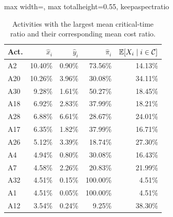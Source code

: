 \begin{table}[H]
\centering
\caption{Activities with the largest mean critical-time ratio and their corresponding mean cost ratio.}
\label{tab:top-activity-cost-critical-time-metric}
\scriptsize
\setlength{\tabcolsep}{4pt}
\renewcommand{\arraystretch}{0.95}
\begin{adjustbox}{max width=\textwidth, max totalheight=0.55\textheight, keepaspectratio}
\begin{tabular}{@{}lrrrr@{}}
\toprule
Act. & $\widehat x_i$ & $\widehat y_i$ & $\widehat\pi_i$ & $\mathbb{E}[X_i\mid i\in\mathcal{C}]$ \\
\midrule
A2 & 10.40\% & 0.90\% & 73.56\% & 14.13\% \\
A20 & 10.26\% & 3.96\% & 30.08\% & 34.11\% \\
A30 & 9.28\% & 1.61\% & 50.27\% & 18.45\% \\
A18 & 6.92\% & 2.83\% & 37.99\% & 18.21\% \\
A28 & 6.88\% & 6.61\% & 28.67\% & 24.01\% \\
A17 & 6.35\% & 1.82\% & 37.99\% & 16.71\% \\
A26 & 5.12\% & 3.39\% & 18.74\% & 27.30\% \\
A4 & 4.94\% & 0.80\% & 30.08\% & 16.43\% \\
A7 & 4.58\% & 2.26\% & 20.83\% & 21.99\% \\
A32 & 4.51\% & 0.15\% & 100.00\% & 4.51\% \\
A1 & 4.51\% & 0.05\% & 100.00\% & 4.51\% \\
A12 & 3.54\% & 0.24\% & 9.25\% & 38.30\% \\
\bottomrule
\end{tabular}
\end{adjustbox}
\end{table}
